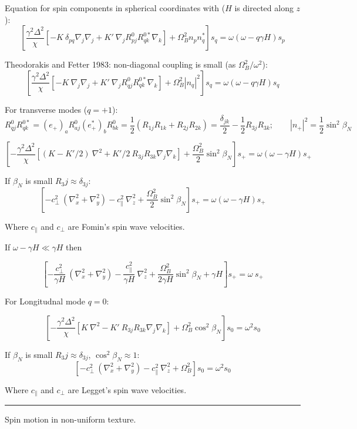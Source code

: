 \documentclass[a4paper]{article}
\begin{document}
Equation for spin components in spherical coordinates with
($H$ is directed along $z$):
$$
\left[
\frac{\gamma^2\Delta^2}{\chi}
  [-K\ \delta_{pq} \nabla_j\nabla_j
 + K'\ \nabla_j R^0_{pj}R^{0*}_{qk}\nabla_k]
+ \Omega_B^2 n_p n_q^*
\right] s_q =
\omega(\omega-q\gamma H) s_p
$$

Theodorakis and Fetter 1983: non-diagonal coupling is small
(as $\Omega_B^2/\omega^2$):
$$
\left[
\frac{\gamma^2\Delta^2}{\chi}
  [-K\ \nabla_j\nabla_j
 + K'\ \nabla_j R^0_{qj}R^{0*}_{qk}\nabla_k]
+ \Omega_B^2 |n_q|^2
\right] s_q =
\omega(\omega-q\gamma H) s_q
$$

For transverse modes ($q=+1$):
$$
R^0_{qj} R^{0*}_{qk}
= (e_{+})_a R^0_{aj} (e_{+}^*)_b R^{0}_{bk}
= \frac12 (R_{1j}R_{1k}+R_{2j}R_{2k})
= \frac{\delta_{jk}}{2}  - \frac12 R_{3j}R_{3k};
\qquad
|n_{+}|^2 = \frac12 \sin^2\beta_N
$$

$$
\left[ -
\frac{\gamma^2\Delta^2}{\chi}
  \left[(K-K'/2)\ \nabla^2
  + K'/2\ R_{3j}R_{3k} \nabla_j\nabla_k
  \right]
+ \frac{\Omega_B^2}{2} \sin^2\beta_N
\right] s_{+} =
\omega(\omega-\gamma H) s_{+}
$$

If $\beta_N$ is small $R_3j \approx \delta_{3j}$:
$$
\left[
- {c_\perp^2}\ (\nabla_x^2+\nabla_y^2)
- {c_\parallel^2}\ \nabla_z^2
+ \frac{\Omega_B^2}{2} \sin^2\beta_N
\right] s_{+} =
\omega(\omega-\gamma H) s_{+}
$$

Where $c_\parallel$ and $c_\perp$ are Fomin's spin wave velocities.

If $\omega-\gamma H \ll \gamma H$ then

$$
\left[
- \frac{c_\perp^2}{\gamma H}\ (\nabla_x^2+\nabla_y^2)
- \frac{c_\parallel^2}{\gamma H}\ \nabla_z^2
+ \frac{\Omega_B^2}{2\gamma H} \sin^2\beta_N + \gamma H
\right] s_{+} =
\omega\ s_{+}
$$

For Longitudnal mode $q=0$:

$$
\left[ -
\frac{\gamma^2\Delta^2}{\chi}
  \left[K\ \nabla^2
  - K'\ R_{3j}R_{3k} \nabla_j\nabla_k
  \right]
+ \Omega_B^2\cos^2\beta_N
\right] s_0 =
\omega^2 s_0
$$

If $\beta_N$ is small $R_3j \approx \delta_{3j}$, $\cos^2\beta_N\approx 1$:
$$
\left[
- {c_\perp^2}\ (\nabla_x^2+\nabla_y^2)
- {c_\parallel^2}\ \nabla_z^2
+ \Omega_B^2 \right] s_0 =
\omega^2 s_0
$$

Where $c_\parallel$ and $c_\perp$ are Legget's spin wave velocities.

\eject
\hrule
\medskip

Spin motion in non-uniform texture.
\end{document}
